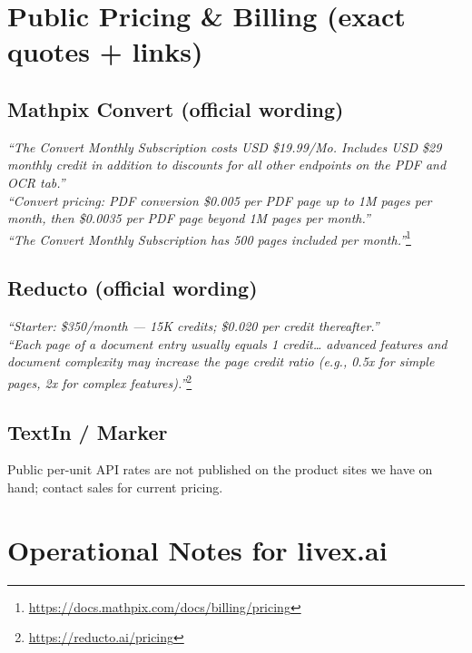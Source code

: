 \documentclass[11pt,a4paper]{article}
\begin{document}
\section*{Public Pricing \& Billing (exact quotes + links)}

\subsection*{Mathpix Convert (official wording)}
\emph{“The Convert Monthly Subscription costs USD \$19.99/Mo. Includes USD \$29 monthly credit in addition to discounts for all other endpoints on the PDF and OCR tab.”} \\
\emph{“Convert pricing: PDF conversion \$0.005 per PDF page up to 1M pages per month, then \$0.0035 per PDF page beyond 1M pages per month.”} \\
\emph{“The Convert Monthly Subscription has 500 pages included per month.”}\footnote{\url{https://docs.mathpix.com/docs/billing/pricing}}

\subsection*{Reducto (official wording)}
\emph{“Starter: \$350/month — 15K credits; \$0.020 per credit thereafter.”} \\
\emph{“Each page of a document entry usually equals 1 credit… advanced features and document complexity may increase the page credit ratio (e.g., 0.5x for simple pages, 2x for complex features).”}\footnote{\url{https://reducto.ai/pricing}}

\subsection*{TextIn / Marker}
Public per-unit API rates are not published on the product sites we have on hand; contact sales for current pricing.

\section*{Operational Notes for livex.ai}
\end{document}
